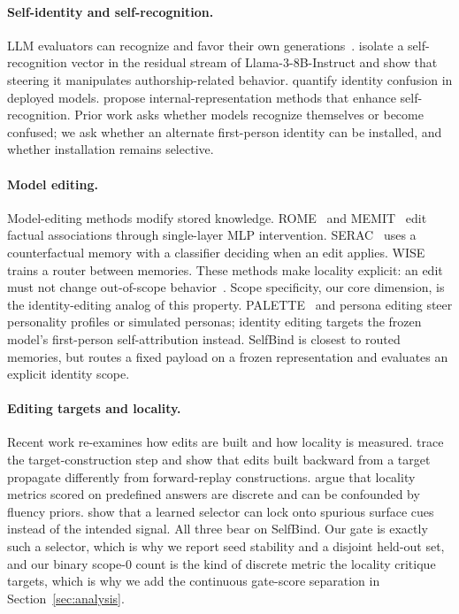 \documentclass[11pt]{article}
\begin{document}
\paragraph{Self-identity and self-recognition.}
LLM evaluators can recognize and favor their own generations~\cite{panickssery2024}. \citet{ackerman2025} isolate a self-recognition vector in the residual stream of Llama-3-8B-Instruct and show that steering it manipulates authorship-related behavior. \citet{identityconfusion2024} quantify identity confusion in deployed models. \citet{cosur2025} propose internal-representation methods that enhance self-recognition. Prior work asks whether models recognize themselves or become confused; we ask whether an alternate first-person identity can be installed, and whether installation remains selective.

\paragraph{Model editing.}
Model-editing methods modify stored knowledge. ROME~\cite{meng2022rome} and MEMIT~\cite{meng2023memit} edit factual associations through single-layer MLP intervention. SERAC~\cite{mitchell2022serac} uses a counterfactual memory with a classifier deciding when an edit applies. WISE~\cite{wang2024wise} trains a router between memories. These methods make locality explicit: an edit must not change out-of-scope behavior~\cite{meng2022rome,mitchell2022serac}. Scope specificity, our core dimension, is the identity-editing analog of this property. PALETTE~\cite{hwang2026palette} and persona editing steer personality profiles or simulated personas; identity editing targets the frozen model's first-person self-attribution instead. SelfBind is closest to routed memories, but routes a fixed payload on a frozen representation and evaluates an explicit identity scope.

\paragraph{Editing targets and locality.}
Recent work re-examines how edits are built and how locality is measured. \citet{liu2026forward} trace the target-construction step and show that edits built backward from a target propagate differently from forward-replay constructions. \citet{liu2026locality} argue that locality metrics scored on predefined answers are discrete and can be confounded by fluency priors. \citet{liu2026escaping} show that a learned selector can lock onto spurious surface cues instead of the intended signal. All three bear on SelfBind. Our gate is exactly such a selector, which is why we report seed stability and a disjoint held-out set, and our binary scope-0 count is the kind of discrete metric the locality critique targets, which is why we add the continuous gate-score separation in Section~\ref{sec:analysis}.
\end{document}
